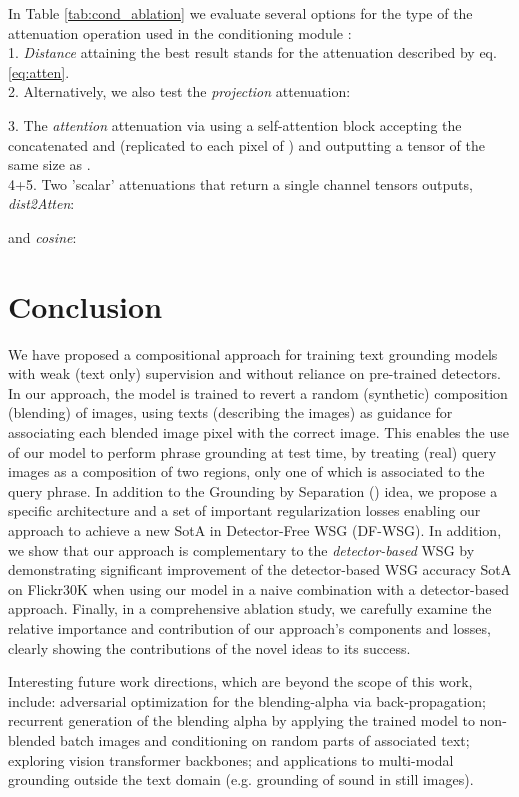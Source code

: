 \documentclass[10pt,twocolumn,letterpaper]{article}
\def\oursfull{Grounding by Separation }
\def\ourstask{DF-WSG}
\def\ourstaskfull{Detector-Free WSG }
\begin{document}
 In Table \ref{tab:cond_ablation} we evaluate several options for the type of the attenuation operation used in the conditioning module :\\ 1. \textit{Distance} attaining the best result stands for the attenuation described by eq. \eqref{eq:atten}. \\
2. Alternatively, we also test the \textit{projection} attenuation:

3. The \textit{attention} attenuation via using a self-attention block accepting the concatenated  and  (replicated to each pixel of ) and outputting a tensor of the same size as . \\
4+5. Two 'scalar' attenuations that return a single channel tensors outputs, \textit{dist2Atten}:

and \textit{cosine}:


%
  \section{Conclusion}\label{sec:conclusions}
We have proposed a compositional approach for training text grounding models with weak (text only) supervision and without reliance on pre-trained detectors. In our \ours{} approach, the model is trained to revert a random (synthetic) composition (blending) of images, using texts (describing the images) as guidance for associating each blended image pixel with the correct image. 
This enables the use of our model to perform phrase grounding at test time, by treating (real) query images as a composition of two regions, only one of which is associated to the query phrase. In addition to the \oursfull (\ours) idea, we propose a specific architecture and a set of important regularization losses enabling our \ours{} approach to achieve a new SotA in \ourstaskfull{} (\ourstask{}). 
In addition, we show that our approach is complementary to the \textit{detector-based} WSG by demonstrating
significant
improvement of the detector-based WSG accuracy SotA on Flickr30K when using our \ours{} model in a naive combination with a detector-based approach. Finally, in a comprehensive ablation study, we carefully examine the relative importance and contribution of our approach's components and losses, clearly showing the contributions of the novel \ours{} ideas to its success.

Interesting future work directions, which are beyond the scope of this work, include: adversarial optimization for the blending-alpha via back-propagation; recurrent generation of the blending alpha by applying the trained model to non-blended batch images and conditioning on random parts of associated text; exploring vision transformer backbones; and applications to multi-modal grounding outside the text domain (e.g. grounding of sound in still images).   \clearpage
{\small


}
\end{document}

